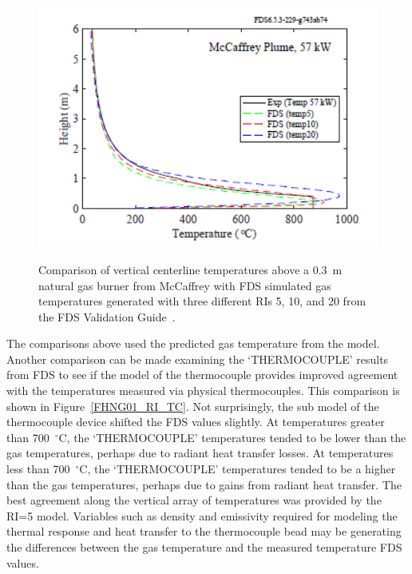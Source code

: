 \documentclass[twoside]{uocthesis}
\begin{document}
{\begin{figure}[h]
	\includegraphics[width=5in] {../Figures/McCaffrey_Plume_comp}  \\
	\caption[Comparison of vertical centerline temperatures above a 0.3~m natural gas burner from McCaffrey with FDS simulated gas temperatures.] {Comparison of vertical centerline temperatures above a 0.3~m natural gas burner from McCaffrey with FDS simulated gas temperatures generated with three different RIs 5, 10, and 20 from the FDS Validation Guide~\cite{FDS_Validation_Guide}.}
	\label{McCaffrey_Plume_comp}
\end{figure}

The comparisons above used the predicted gas temperature from the model. Another comparison can be made examining the `THERMOCOUPLE' results from FDS to see if the model of the thermocouple provides improved agreement with the temperatures measured via physical thermocouples.  This comparison is shown in Figure~\ref{FHNG01_RI_TC}.  Not surprisingly, the sub model of the thermocouple device shifted the FDS values slightly.  At temperatures greater than 700~$^\circ$C, the `THERMOCOUPLE' temperatures tended to be lower than the gas temperatures, perhaps due to radiant heat transfer losses. At temperatures less than 700~$^\circ$C, the `THERMOCOUPLE' temperatures tended to be a higher than the gas temperatures, perhaps due to gains from radiant heat transfer.  The best agreement along the vertical array of temperatures was provided by the RI=5 model.  Variables such as density and emissivity required for modeling the thermal response and heat transfer to the thermocouple bead may be generating the differences between the gas temperature and the measured temperature FDS values.  

}
\end{document}
